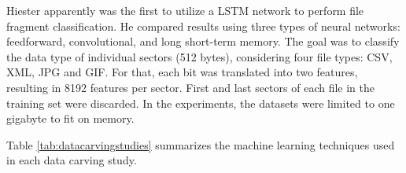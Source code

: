 Hiester \cite{hiester_file_2018} apparently was the first to utilize a LSTM network to perform file fragment classification. He compared results using three types of neural networks: feedforward, convolutional, and long short-term memory. The goal was to classify the data type of individual sectors (512 bytes), considering four file types: CSV, XML, JPG and GIF. For that, each bit was translated into two features, resulting in 8192 features per sector. First and last sectors of each file in the training set were discarded. In the experiments, the datasets were limited to one gigabyte to fit on memory.

Table \ref{tab:datacarvingstudies} summarizes the  machine learning techniques used in each data carving study.

